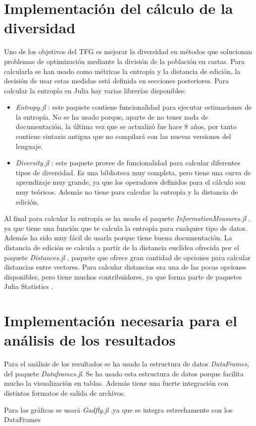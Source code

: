 \section{Implementación del cálculo de la diversidad}

Uno de los objetivos del TFG es mejorar la diversidad en métodos que solucionan problemas de optimización mediante la división de la población en castas.
Para calcularla se han usado como métricas la entropía y la distancia de edición, la decisión de usar estas medidas
está definida en secciones posteriores. Para calcular la entropía en Julia hay varias librerías disponibles:

\begin{itemize}
    \item \emph{Entropy.jl} \cite{entropy_jl}: este paquete contiene funcionalidad para ejecutar estimaciones de la entropía. No se ha usado porque,
    aparte de no tener nada de documentación, la última vez que se actualizó fue hace 8 años, por tanto contiene
    sintaxis antigua que no compilará con las nuevas versiones del lenguaje.
    \item \emph{Diversity.jl} \cite{diversity_jl}: este paquete provee de funcionalidad para calcular diferentes
    tipos de diversidad. Es una biblioteca muy completa, pero tiene una curva de aprendizaje muy grande, ya que los
    operadores definidos para el cálculo son muy teóricos. Además no tiene para calcular la entropía y la distancia
    de edición.
\end{itemize}

Al final para calcular la entropía se ha usado el paquete \emph{InformationMeasures.jl} \cite{informationMeasures_jl}, ya 
que tiene una función que te calcula la entropía para cualquier tipo de datos. Además ha sido muy fácil de usarla porque 
tiene buena documentación. La distancia de edición se calcula a partir de la distancia euclídea ofrecida por el paquete
\emph{Distances.jl} \cite{distances_jl}, paquete que ofrece gran cantidad de opciones para calcular distancias entre vectores.
Para calcular distancias era una de las pocas opciones disponibles, pero tiene muchos contribuidores, ya que forma 
parte de paquetes Julia Statistics \cite{stats_jl}.

\section{Implementación necesaria para el análisis de los resultados}

Para el análisis de los resultados se ha usado la estructura de datos \emph{DataFrames}, del paquete \emph{Dataframes.jl}. Se
ha usado esta estructura de datos porque facilita mucho la visualización en tablas. Además tiene una fuerte
integración con distintos formatos de salida de archivos. 

Para las gráficas se usará \emph{Gadfly.jl} \cite{gadfly_jl},ya que se integra estrechamente con los DataFrames
